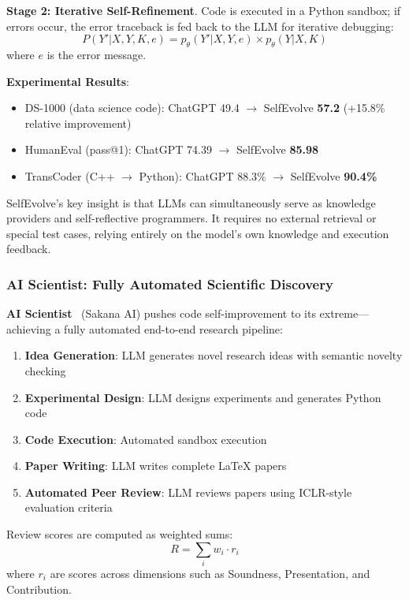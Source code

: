 \textbf{Stage 2: Iterative Self-Refinement}. Code is executed in a Python sandbox; if errors occur, the error traceback is fed back to the LLM for iterative debugging:
\begin{equation}
P(Y'|X,Y,K,e) = p_\theta(Y'|X,Y,e) \times p_\theta(Y|X,K)
\label{eq:selfevolve-refine}
\end{equation}
where $e$ is the error message.

\textbf{Experimental Results}:
\begin{itemize}
\item DS-1000 (data science code): ChatGPT 49.4 $\rightarrow$ SelfEvolve \textbf{57.2} (+15.8\% relative improvement)
\item HumanEval (pass@1): ChatGPT 74.39 $\rightarrow$ SelfEvolve \textbf{85.98}
\item TransCoder (C++ $\rightarrow$ Python): ChatGPT 88.3\% $\rightarrow$ SelfEvolve \textbf{90.4\%}
\end{itemize}

SelfEvolve's key insight is that LLMs can simultaneously serve as knowledge providers and self-reflective programmers. It requires no external retrieval or special test cases, relying entirely on the model's own knowledge and execution feedback.

\subsubsection{AI Scientist: Fully Automated Scientific Discovery}

\textbf{AI Scientist}~\citep{aiscientist2024} (Sakana AI) pushes code self-improvement to its extreme---achieving a fully automated end-to-end research pipeline:

\begin{enumerate}
\item \textbf{Idea Generation}: LLM generates novel research ideas with semantic novelty checking
\item \textbf{Experimental Design}: LLM designs experiments and generates Python code
\item \textbf{Code Execution}: Automated sandbox execution
\item \textbf{Paper Writing}: LLM writes complete LaTeX papers
\item \textbf{Automated Peer Review}: LLM reviews papers using ICLR-style evaluation criteria
\end{enumerate}

Review scores are computed as weighted sums:
\begin{equation}
R = \sum_i w_i \cdot r_i
\label{eq:aiscientist-score}
\end{equation}
where $r_i$ are scores across dimensions such as Soundness, Presentation, and Contribution.

